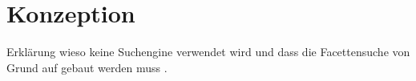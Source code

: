 \chapter{Konzeption}
\label{ch:Konzeption}

Erklärung wieso keine Suchengine verwendet wird und dass die Facettensuche von Grund auf gebaut werden muss \cite{TODO}.



